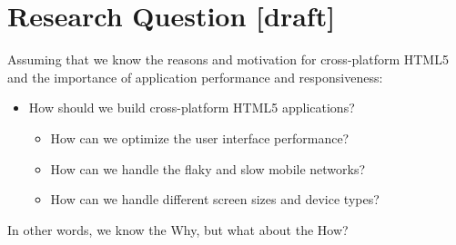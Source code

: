 \chapter{Research Question [draft]}
\label{chapter:research-question}

Assuming that we know the reasons and motivation for cross-platform
HTML5 and the importance of application performance and
responsiveness:

\begin{itemize}
\item How should we build cross-platform HTML5 applications?

  \begin{itemize}
  \item How can we optimize the user interface performance?
  \item How can we handle the flaky and slow mobile networks?
  \item How can we handle different screen sizes and device types?
  \end{itemize}
\end{itemize}

\noindent In other words, we know the Why, but what about the How?
